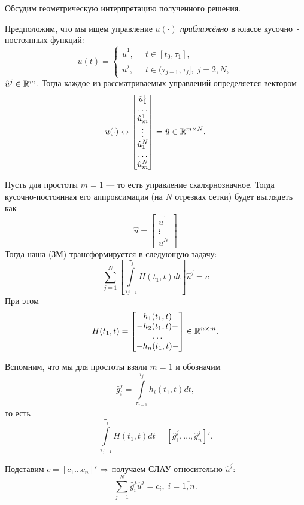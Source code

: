 Обсудим геометрическую интерпретацию полученного решения.

Предположим, что мы ищем управление $u(\cdot)$ \textit{приближённо} в классе кусочно~-постоянных функций:
$$
u(t) = \left\{
    \begin{aligned}
        \hat{u}^1, & \;\; t \in [t_0, \tau_1],\\
        \hat{u}^j, & \;\; t \in (\tau_{j-1}, \tau_{j}], \; j = \overline{2, N},
    \end{aligned}
\right.
$$
$\hat{u}^j \in \mathbb{R}^m$. Тогда каждое из рассматриваемых управлений определяется вектором
$$
u(\cdot) \leftrightarrow \begin{bmatrix}
    \hat{u}^1_1 \\ \ldots \\ \hat{u}^1_m \\ \vdots \\ \hat{u}^N_1 \\ \ldots \\ \hat{u}^N_m
\end{bmatrix} = \hat{u} \in \mathbb{R}^{m \times N}.
$$

Пусть для простоты $m = 1$ --- то есть управление скалярнозначное. Тогда кусочно-постоянная его аппроксимация (на $N$ отрезках сетки) будет выглядеть как
$$
\hat{u} = \begin{bmatrix}
    \hat{u}^1 \\ \vdots \\ \hat{u}^N
\end{bmatrix}
$$
Тогда наша (ЗМ) трансформируется в следующую задачу:
$$
\sum\limits_{j=1}^{N} \left[ \int\limits_{\tau_{j-1}}^{\tau_j} H(t_1, t) dt \right] \hat{u}^j = c
$$
При этом
$$
H(t_1, t) =
\begin{bmatrix}
    - h_1(t_1, t) -\\
    - h_2(t_1, t) -\\
    \ldots \\
    - h_n(t_1, t) -\\
\end{bmatrix}
\in \mathbb{R}^{n \times m}.
$$

Вспомним, что мы для простоты взяли $m = 1$ и обозначим
$$
\hat{g}^j_i = \int\limits_{\tau_{j-1}}^{\tau_j} h_i(t_1, t) dt,
$$
то есть
$$
\int\limits_{\tau_{j-1}}^{\tau_j} H(t_1, t) dt = [\hat{g}^j_1, \ldots, \hat{g}^j_n]'.
$$

Подставим $c = [c_1  \ldots c_n]'$ $\operatorname*{\Rightarrow}$ получаем СЛАУ относительно $\hat{u}^j$:
$$
\sum\limits_{j=1}^{N} \hat{g}^j_i \hat{u}^j = c_i, \; i = \overline{1, n}.
$$

